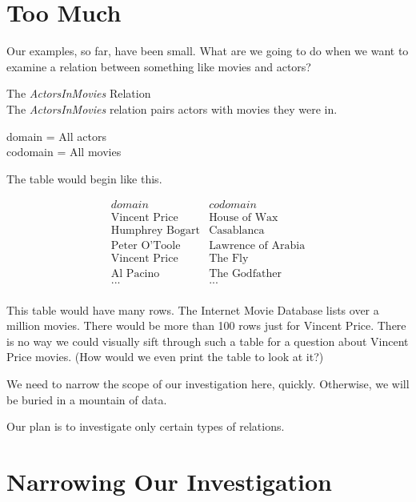 \documentclass{ximera}
\begin{document}
\section{Too Much}

Our examples, so far, have been small.  What are we going to do when we want to examine a relation between something like movies and actors?  


\begin{example} The \textit{ActorsInMovies} Relation\\
The \textit{ActorsInMovies} relation pairs actors with movies they were in.

domain = All actors \\
codomain = All movies

The table would begin like this.

\[
\begin{array}{l|l}
    domain      & codomain      \\ \hline
    \text{Vincent Price}   &  \text{House of Wax} \\
    \text{Humphrey Bogart}   & \text{Casablanca} \\
    \text{Peter O'Toole}  &  \text{Lawrence of Arabia} \\
    \text{Vincent Price}  &  \text{The Fly} \\
    \text{Al Pacino} &  \text{The Godfather} \\ 
    \text{...} &  \text{...} \\ 
\end{array}
\]

\end{example} 


This table would have many rows. The Internet Movie Database lists over a million movies.  There would be more than 100 rows just for Vincent Price. There is no way we could visually sift through such a table for a question about Vincent Price movies. (How would we even print the table to look at it?)

We need to narrow the scope of our investigation here, quickly. Otherwise, we will be buried in a mountain of data.

Our plan is to investigate only certain types of relations.








\section{Narrowing Our Investigation}
\end{document}
